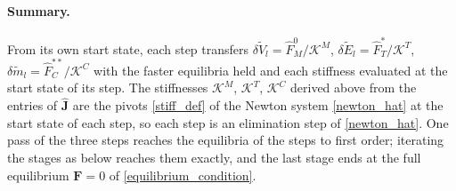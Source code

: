 \paragraph{Summary.}
From its own start state, each step transfers $\delta\tilde{V}_l=\hat{F}_M^0/\mathcal{K}^M$, $\delta\tilde{E}_l=\hat{F}_T^*/\mathcal{K}^T$, $\delta\tilde{m}_l=\hat{F}_C^{**}/\mathcal{K}^C$ with the faster equilibria held and each stiffness evaluated at the start state of its step. The stiffnesses $\mathcal{K}^M$, $\mathcal{K}^T$, $\mathcal{K}^C$ derived above from the entries of $\hat{\boldsymbol{J}}$ are the pivots \eqref{stiff_def} of the Newton system \eqref{newton_hat} at the start state of each step, so each step is an elimination step of \eqref{newton_hat}. One pass of the three steps reaches the equilibria of the steps to first order; iterating the stages as below reaches them exactly, and the last stage ends at the full equilibrium $\boldsymbol{F}=0$ of \eqref{equilibrium_condition}.

